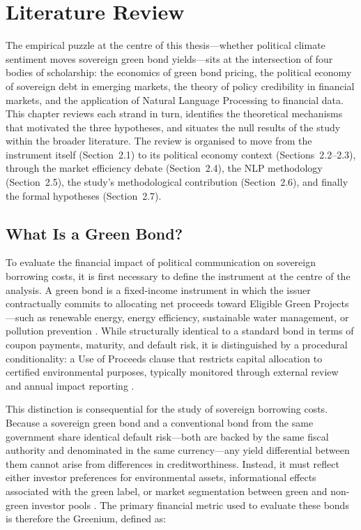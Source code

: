 \documentclass[12pt,a4paper]{article}
\begin{document}

\newpage
\setcounter{section}{1}
\section{Literature Review}

The empirical puzzle at the centre of this thesis---whether political climate sentiment moves sovereign green bond yields---sits at the intersection of four bodies of scholarship: the economics of green bond pricing, the political economy of sovereign debt in emerging markets, the theory of policy credibility in financial markets, and the application of Natural Language Processing to financial data. This chapter reviews each strand in turn, identifies the theoretical mechanisms that motivated the three hypotheses, and situates the null results of the study within the broader literature. The review is organised to move from the instrument itself (Section~2.1) to its political economy context (Sections~2.2--2.3), through the market efficiency debate (Section~2.4), the NLP methodology (Section~2.5), the study's methodological contribution (Section~2.6), and finally the formal hypotheses (Section~2.7).


\subsection{What Is a Green Bond?}

To evaluate the financial impact of political communication on sovereign borrowing costs, it is first necessary to define the instrument at the centre of the analysis. A green bond is a fixed-income instrument in which the issuer contractually commits to allocating net proceeds toward Eligible Green Projects---such as renewable energy, energy efficiency, sustainable water management, or pollution prevention \citep{ICMA2022}. While structurally identical to a standard bond in terms of coupon payments, maturity, and default risk, it is distinguished by a procedural conditionality: a Use of Proceeds clause that restricts capital allocation to certified environmental purposes, typically monitored through external review and annual impact reporting \citep{ICMA2022}.

This distinction is consequential for the study of sovereign borrowing costs. Because a sovereign green bond and a conventional bond from the same government share identical default risk---both are backed by the same fiscal authority and denominated in the same currency---any yield differential between them cannot arise from differences in creditworthiness. Instead, it must reflect either investor preferences for environmental assets, informational effects associated with the green label, or market segmentation between green and non-green investor pools \citep{Zerbib2019}. The primary financial metric used to evaluate these bonds is therefore the Greenium, defined as:
\end{document}
